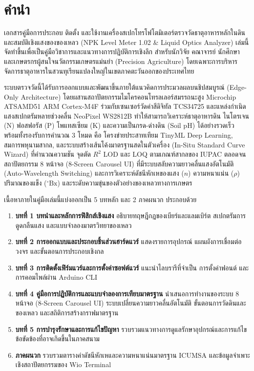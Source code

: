 \chapter*{คำนำ}

เอกสารคู่มือการประกอบ ติดตั้ง และใช้งานเครื่องสเปกโทรโฟโตมิเตอร์ตรวจวัดธาตุอาหารหลักในดินและสมบัติเชิงแสงของของเหลว (NPK Level Meter 1.02 \& Liquid Optics Analyzer) เล่มนี้ จัดทำขึ้นเพื่อเป็นคู่มือวิชาการและแนวทางการปฏิบัติการเชิงลึก สำหรับนักวิจัย คณาจารย์ นักศึกษา และเกษตรกรผู้สนใจนวัตกรรมเกษตรแม่นยำ (Precision Agriculture) โดยเฉพาะการบริหารจัดการธาตุอาหารในสวนทุเรียนแปลงใหญ่ในเขตภาคตะวันออกของประเทศไทย

ระบบตรวจวัดนี้ได้รับการออกแบบและพัฒนาขึ้นภายใต้แนวคิดการประมวลผลบนชิปสมบูรณ์ (Edge-Only Architecture) โดยผสานสถาปัตยกรรมไมโครคอนโทรลเลอร์สมรรถนะสูง Microchip ATSAMD51 ARM Cortex-M4F ร่วมกับเซนเซอร์วัดค่าสีดิจิทัล TCS34725 และแหล่งกำเนิดแสงสเปกตรัมหลายช่วงคลื่น NeoPixel WS2812B ทำให้สามารถวิเคราะห์ธาตุอาหารดิน ไนโตรเจน (N) ฟอสฟอรัส (P) โพแทสเซียม (K) และความเป็นกรด-ด่างดิน (Soil pH) ได้อย่างรวดเร็ว พร้อมทั้งรองรับการคำนวณ 3 โหมด คือ โครงข่ายประสาทเทียม TinyML Deep Learning, สมการพหุนามสากล, และระบบสร้างเส้นโค้งมาตรฐานสดในตัวเครื่อง (In-Situ Standard Curve Wizard) ที่คำนวณความชัน จุดตัด $R^2$ LOD และ LOQ ตามเกณฑ์สากลของ IUPAC ตลอดจนสถาปัตยกรรม 8 หน้าจอ (8-Screen Carousel UI) ที่มีระบบสลับความยาวคลื่นแสงอัตโนมัติ (Auto-Wavelength Switching) และการวิเคราะห์ดัชนีหักเหของแสง ($n$) ความหนาแน่น ($\rho$) ปริมาณของแข็ง ($^\circ\text{Bx}$) และระดับความขุ่นของตัวอย่างของเหลวทางการเกษตร

เนื้อหาภายในคู่มือเล่มนี้แบ่งออกเป็น 5 บทหลัก และ 2 ภาคผนวก ประกอบด้วย
\begin{enumerate}[leftmargin=1.5em, itemsep=3pt]
    \item \textbf{บทที่ 1 บทนำและหลักการฟิสิกส์เชิงแสง} อธิบายทฤษฎีกฎของเบียร์และแลมเบิร์ต สเปกตรัมการดูดกลืนแสง และแบบจำลองมาตรวิทยาของเหลว
    \item \textbf{บทที่ 2 การออกแบบและประกอบชิ้นส่วนฮาร์ดแวร์} แสดงรายการอุปกรณ์ แผนผังการเชื่อมต่อวงจร และขั้นตอนการประกอบเชิงกล
    \item \textbf{บทที่ 3 การติดตั้งเฟิร์มแวร์และการตั้งค่าซอฟต์แวร์} แนะนำไลบรารีที่จำเป็น การตั้งค่าฟอนต์ และการคอมไพล์ผ่าน Arduino CLI
    \item \textbf{บทที่ 4 คู่มือการปฏิบัติการและแบบจำลองการเทียบมาตรฐาน} นำเสนอการทำงานของระบบ 8 หน้าจอ (8-Screen Carousel UI) ระบบเปลี่ยนความยาวคลื่นอัตโนมัติ ขั้นตอนการวัดดินและของเหลว และสถิติการสร้างกราฟมาตรฐาน
    \item \textbf{บทที่ 5 การบำรุงรักษาและการแก้ไขปัญหา} รวบรวมแนวทางการดูแลรักษาอุปกรณ์และการแก้ไขข้อขัดข้องที่อาจเกิดขึ้นในภาคสนาม
    \item \textbf{ภาคผนวก} รวบรวมตารางค่าดัชนีหักเหและความหนาแน่นมาตรฐาน ICUMSA และข้อมูลจำเพาะเชิงสถาปัตยกรรมของ Wio Terminal
\end{enumerate}

